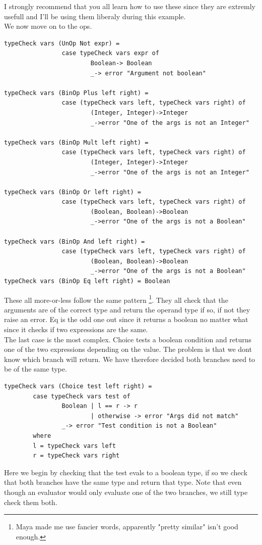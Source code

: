 \documentclass{article}
\begin{document}
            I strongly recommend that you all learn how to use these since they are extremly usefull and I'll be using them liberaly during this example.\\
            We now move on to the ops. 
            \begin{lstlisting}
typeCheck vars (UnOp Not expr) = 
                case typeCheck vars expr of
                        Boolean-> Boolean 
                        _-> error "Argument not boolean"

typeCheck vars (BinOp Plus left right) = 
                case (typeCheck vars left, typeCheck vars right) of
                        (Integer, Integer)->Integer
                        _->error "One of the args is not an Integer"

typeCheck vars (BinOp Mult left right) = 
                case (typeCheck vars left, typeCheck vars right) of
                        (Integer, Integer)->Integer
                        _->error "One of the args is not an Integer"

typeCheck vars (BinOp Or left right) = 
                case (typeCheck vars left, typeCheck vars right) of
                        (Boolean, Boolean)->Boolean
                        _->error "One of the args is not a Boolean"

typeCheck vars (BinOp And left right) = 
                case (typeCheck vars left, typeCheck vars right) of
                        (Boolean, Boolean)->Boolean
                        _->error "One of the args is not a Boolean"
typeCheck vars (BinOp Eq left right) = Boolean
            \end{lstlisting}
            These all more-or-less follow the same pattern \footnote{Maya made me use fancier words, apparently "pretty similar" isn't good enough.}.
            They all check that the arguments are of the correct type and return the operand type if so, if not they raise an error.
            Eq is the odd one out since it returns a boolean no matter what since it checks if two expressions are the same.\\
            The last case is the most complex. Choice tests a boolean condition and returns one of the two expressions depending on the value.
            The problem is that we dont know which branch will return. We have therefore decided both branches need to be of the same type.
            \begin{lstlisting}
typeCheck vars (Choice test left right) = 
        case typeCheck vars test of
                Boolean | l == r -> r
                        | otherwise -> error "Args did not match"
                _-> error "Test condition is not a Boolean"
        where 
        l = typeCheck vars left
        r = typeCheck vars right
            \end{lstlisting}
            Here we begin by checking that the test evals to a boolean type, if so we check that both branches have the same type and return that type.
            Note that even though an evaluator would only evaluate one of the two branches, we still type check them both.
\end{document}
